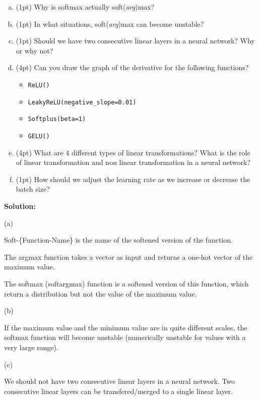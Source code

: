 \begin{enumerate}[(a)]
    \item (1pt) Why is softmax actually soft(\textit{arg})max?
    \item (1pt) In what situations, soft(\textit{arg})max can become unstable?
    \item (1pt) Should we have two consecutive linear layers in a neural network? Why or why not? 
    
    \item (4pt) Can you draw the graph of the derivative for the following functions?
    \begin{itemize}
        \item \texttt{ReLU()}
        \item \texttt{LeakyReLU(negative\_slope=0.01)}
        \item \texttt{Softplus(beta=1)}
        \item \texttt{GELU()}
    \end{itemize}
    
    \item (4pt) What are 4 different types of linear transformations? What is the role of linear transformation and non linear transformation in a neural network?
    \item (1pt) How should we adjust the learning rate as we increase or decrease the batch size?
    
    
\end{enumerate}


\textbf{Solution:}

(a)

Soft-\{Function-Name\} is the name of the softened version of the function.

The argmax function takes a vector as input and returns a one-hot vector of the maximum value.

The softmax (softargmax) function is a softened version of this function, which return a distribution but not the value of the maximum value.


(b)

If the maximum value and the minimum value are in quite different scales, the softmax function will become unstable (numerically unstable for values with a very large range). 

(c)

We should not have two consecutive linear layers in a neural network. Two consecutive linear layers can be transfered/merged to a single linear layer.


